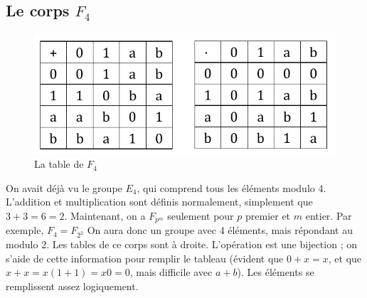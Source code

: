 \documentclass[11pt,a4paper]{article}
\begin{document}
\subsection{Le corps $F_4$}
\begin{figure}
	\centering
	\includegraphics[scale=0.5]{images/tables}
	\caption{La table de $F_4$}
	\label{f4}
\end{figure}
On avait déjà vu le groupe $E_4$, qui comprend tous les éléments modulo 4. L'addition et multiplication sont définis normalement, simplement que $3+3 = 6 = 2$. Maintenant, on a $F_{p^m}$ seulement pour $p$ premier et $m$ entier. Par exemple, $F_4 = F_{2^2}$ On aura donc un groupe avec 4 éléments, mais répondant au modulo 2. Les tables de ce corps sont à droite. L'opération est une bijection ; on s'aide de cette information pour remplir le tableau (évident que $0+x = x$, et que $x+x = x(1+1) = x0 = 0$, mais difficile avec $a+b$). Les éléments se remplissent assez logiquement.
\end{document}
